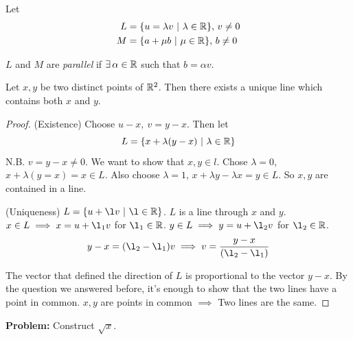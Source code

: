 \documentclass[10pt]{scrartcl}
\begin{document}

Let \begin{align*}L &= \{ u = \lambda v ~|~ \lambda \in \mathbb{R}\},\,v \neq 0\\M &= \{a + \mu b ~|~ \mu \in \mathbb{R}\},\,b \neq 0\end{align*}

\begin{definition}$L$ and $M$ are \emph{parallel} if $\exists\, \alpha \in \mathbb{R}$ such that $b = \alpha v$.	
\end{definition}\vsp


\begin{proposition}
Let $x,y$ be two distinct points of $\mathbb{R}^2$. Then there exists a unique line which contains both $x$ and $y$. 	
\end{proposition}

\begin{proof}
(Existence) Choose $u - x,~ v = y-x$. Then let \[L = \{x + \lambda(y-x) ~|~ \lambda \in \mathbb{R}\}\] N.B. $v = y-x \neq 0$. We want to show that $x,y \in l$. Chose $\lambda = 0$, $x + \lambda(y=x) = x \in L$. Also choose $\lambda = 1$, $x + \lambda y - \lambda x = y \in L$. So $x,y$ are contained in a line. 


(Uniqueness) $L = \{u + \l v ~|~ \l \in \RR \}$. $L$ is a line through $x$ and $y$. $x \in L\implies x = u + \l_1v $
 for $\l_1 \in \RR$. $y \in L\implies y = u + \l_2v$ for $\l_2 \in \R$. 
\[y-x = (\l_2 - \l_1)v \implies v = \frac{y-x}{(\l_2 -\l_1)}\]

The vector that defined the direction of $L$ is proportional to the vector $y-x$. By the question we answered before, it's enough to show that the two lines have a point in common. $x,y$ are points in common $\implies$ Two lines are the same. 
\end{proof}


\textbf{Problem: } Construct $\sqrt{x}$. 
\begin{center}
\end{center}
\end{document}
